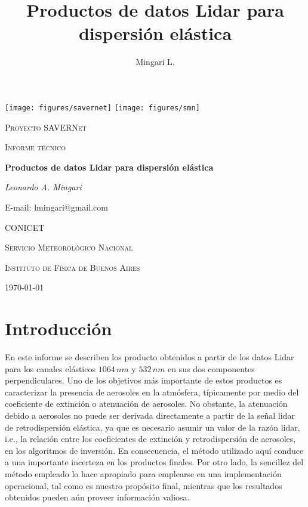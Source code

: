 \documentclass[12pt,a4paper,final]{report}
\author{Mingari L.}
\title{Productos de datos Lidar para dispersión elástica}
\begin{document}
\begin{titlepage}
	\centering
	\texttt{[image: figures/savernet]} \hfill
    \texttt{[image: figures/smn]}\par \vspace{1cm}
	{\scshape\LARGE Proyecto SAVERNet \par}
	\vspace{1cm}
	{\scshape\Large Informe técnico\par}
	\vspace{1.5cm}
	{\huge\bfseries Productos de datos Lidar para dispersión elástica\par}
	\vspace{2cm}
	{\Large\itshape Leonardo A. Mingari\par}
	{E-mail: lmingari@gmail.com\par}
	\vfill
	\textsc{CONICET}\par
	\textsc{Servicio Meteorológico Nacional}\par
	\textsc{Instituto de Física de Buenos Aires}\par
	\vfill
	{\large \today\par}
\end{titlepage}

	\tableofcontents
	\chapter{Introducción}
	En este informe se describen los producto obtenidos a partir de los datos Lidar para los canales elásticos $1064 \, nm$ y $532 \, nm$ en sus dos componentes perpendiculares. Uno de los objetivos más importante de estos productos es caracterizar la presencia de aerosoles en la atmósfera, típicamente por medio del coeficiente de extinción o atenuación de aerosoles. No obstante, la atenuación debido a aerosoles no puede ser derivada directamente a partir de la señal lidar de retrodispersión elástica, ya que es necesario asumir un valor de la razón lidar, i.e., la relación entre los coeficientes de extinción y retrodispersión de aerosoles, en los algoritmos de inversión. En consecuencia, el método utilizado aquí conduce a una importante incerteza en los productos finales. Por otro lado, la sencillez del método empleado lo hace apropiado para emplearse en una implementación operacional, tal como es nuestro propósito final, mientras que los resultados obtenidos pueden aún proveer información valiosa.
	
\end{document}
